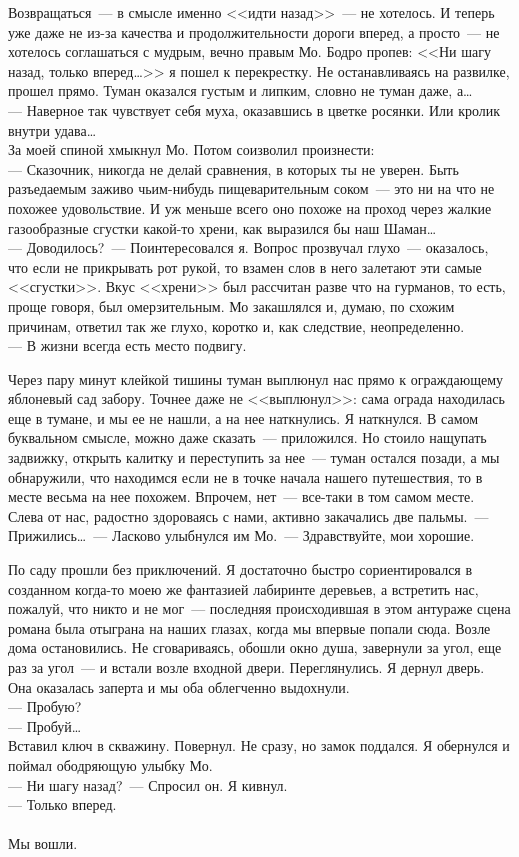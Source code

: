 Возвращаться~--- в смысле именно <<идти назад>>~--- не хотелось. И теперь уже 
даже не из-за качества и продолжительности дороги вперед, а просто~--- не хотелось 
соглашаться с мудрым, вечно правым Мо. Бодро пропев: <<Ни шагу назад, только 
вперед\ldots>> я пошел к перекрестку. Не останавливаясь на развилке, прошел 
прямо. Туман оказался густым и липким, словно не туман даже, а\ldots\\
--- Наверное так чувствует себя муха, оказавшись в цветке росянки. Или кролик 
внутри удава\ldots\\
За моей спиной хмыкнул Мо. Потом соизволил произнести:\\
--- Сказочник, никогда не делай сравнения, в которых ты не уверен. Быть 
разъедаемым заживо чьим-нибудь пищеварительным соком~--- это ни на что не 
похожее удовольствие. И уж меньше всего оно похоже на проход через жалкие газообразные 
сгустки какой-то хрени, как выразился бы наш Шаман\ldots\\
--- Доводилось?~--- Поинтересовался я. Вопрос прозвучал глухо~--- оказалось, что 
если не прикрывать рот рукой, то взамен слов в него залетают эти самые <<сгустки>>. 
Вкус <<хрени>> был рассчитан разве что на гурманов, то есть, проще говоря, был 
омерзительным. Мо закашлялся и, думаю, по схожим причинам, ответил так же 
глухо, коротко и, как следствие, неопределенно.\\
--- В жизни всегда есть место подвигу.

Через пару минут клейкой тишины туман выплюнул нас прямо к ограждающему 
яблоневый сад забору. Точнее даже не <<выплюнул>>: сама ограда находилась еще в 
тумане, и мы ее не нашли, а на нее наткнулись. Я наткнулся. В самом буквальном 
смысле, можно даже сказать~--- приложился. Но стоило нащупать задвижку, открыть 
калитку и переступить за нее~--- туман остался позади, а мы обнаружили, что 
находимся если не в точке начала нашего путешествия, то в месте весьма на нее 
похожем. Впрочем, нет~--- все-таки в том самом месте. Слева от нас, радостно 
здороваясь с нами, активно закачались две пальмы.~--- Прижились\ldots~--- 
Ласково улыбнулся им Мо.~--- Здравствуйте, мои хорошие.

По саду прошли без приключений. Я достаточно быстро сориентировался в созданном 
когда-то моею же фантазией лабиринте деревьев, а встретить нас, пожалуй, что 
никто и не мог~--- последняя происходившая в этом антураже сцена романа была 
отыграна на наших глазах, когда мы впервые попали сюда. Возле дома 
остановились. 
Не сговариваясь, обошли окно душа, завернули за угол, еще раз за угол~--- и 
встали возле входной двери. Переглянулись. Я дернул дверь. Она оказалась заперта и мы 
оба облегченно выдохнули.\\
--- Пробую?\\
--- Пробуй\ldots\\
Вставил ключ в скважину. Повернул. Не сразу, но замок поддался. Я обернулся и 
поймал ободряющую улыбку Мо.\\
--- Ни шагу назад?~--- Спросил он. Я кивнул.\\
--- Только вперед.\\
\\
Мы вошли.


